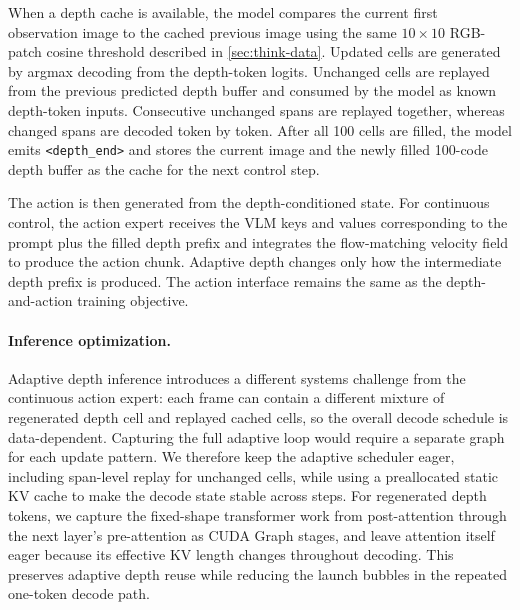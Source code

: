 When a depth cache is available, the model compares the current first
observation image to the cached previous image using the same \(10 \times 10\)
RGB-patch cosine threshold described in \autoref{sec:think-data}. Updated cells
are generated by argmax decoding from the depth-token logits. Unchanged cells
are replayed from the previous predicted depth buffer and consumed by the model
as known depth-token inputs. Consecutive unchanged spans are replayed together,
whereas changed spans are decoded token by token. After all 100 cells are
filled, the model emits \texttt{<depth\_end>} and stores the current image and
the newly filled 100-code depth buffer as the cache for the next control step.

The action is then generated from the depth-conditioned state. For continuous
control, the action expert receives the VLM keys and values corresponding to
the prompt plus the filled depth prefix and integrates the flow-matching
velocity field to produce the action chunk. Adaptive depth changes only how the intermediate depth prefix is produced. The
action interface remains the same as the depth-and-action training objective.



\paragraph{Inference optimization.}
Adaptive depth inference introduces a different systems challenge from the continuous action expert: each frame can contain a different mixture of regenerated depth cell and replayed cached cells, so the overall decode schedule is data-dependent. Capturing the full adaptive loop would require a separate graph for each update pattern. We therefore keep the adaptive scheduler eager, including span-level replay for unchanged cells, while using a preallocated static KV cache to make the decode state stable across steps. For regenerated depth tokens, we capture the fixed-shape transformer work from post-attention through the next layer's pre-attention as CUDA Graph stages, and leave attention itself eager because its effective KV length changes throughout decoding. This preserves adaptive depth reuse while reducing the launch bubbles in the repeated one-token decode path.



